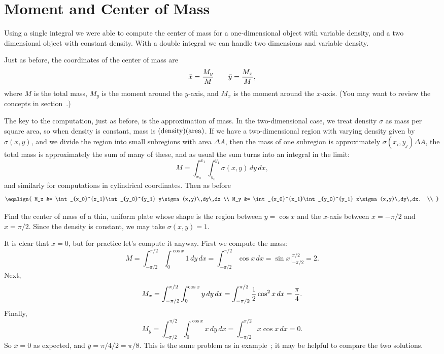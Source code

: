 \section{Moment and Center of Mass}{}{}

Using a single integral we were able to compute the center of mass for
a one-dimensional object with variable density, and a two dimensional
object with constant density. With a double integral we can handle two
dimensions and variable density.

Just as before, the coordinates of the center of mass are
$$\bar x={M_y\over M} \qquad \bar y={M_x\over M},$$
where $M$ is the total mass, $M_y$ is the moment
 around the $y$-axis,
and $M_x$ is the moment around the $x$-axis. (You may want to review
the concepts in section~.) 

The key to the computation, just as before, is the approximation of
mass. In the two-dimensional case, we treat density $\sigma$ as mass
per square area, so when density is constant, mass is 
$(\hbox{density})(\hbox{area})$. If we have a two-dimensional region
with varying density given by $\sigma(x,y)$, and we divide the region
into small subregions with area $\Delta A$, then the mass of one
subregion is approximately $\sigma(x_i,y_j)\Delta A$, the total mass
is approximately the sum of many of these, 
and as usual the sum
turns into an integral in the limit:
$$M=\int_{x_0}^{x_1}\int_{y_0}^{y_1} \sigma(x,y)\,dy\,dx,$$
and similarly for computations in cylindrical coordinates.
Then as before
$$\eqalign{
M_x &= \int_{x_0}^{x_1}\int_{y_0}^{y_1} y\sigma(x,y)\,dy\,dx \\
M_y &= \int_{x_0}^{x_1}\int_{y_0}^{y_1} x\sigma(x,y)\,dy\,dx. \\
}$$

\begin{example} Find the center of mass of a thin, uniform plate whose shape
is the region between $y=\cos x$ and the $x$-axis between $x=-\pi/2$
and $x=\pi/2$. Since the density is constant, we may take
$\sigma(x,y)=1$. 

It is clear that $\bar x=0$, but for practice let's
compute it anyway. First we compute the mass:
$$
M=\int_{-\pi/2}^{\pi/2} \int_0^{\cos x} 1\,dy\,dx
=\int_{-\pi/2}^{\pi/2} \cos x\,dx
=\left.\sin x\right|_{-\pi/2}^{\pi/2}=2.
$$
Next,
$$
M_x=\int_{-\pi/2}^{\pi/2} \int_0^{\cos x} y\,dy\,dx
=\int_{-\pi/2}^{\pi/2} {1\over2}\cos^2 x\,dx={\pi\over4}.
$$
Finally,
$$
M_y=\int_{-\pi/2}^{\pi/2} \int_0^{\cos x} x\,dy\,dx
=\int_{-\pi/2}^{\pi/2} x\cos x\,dx=0.
$$
So $\bar x=0$ as expected, and $\bar y=\pi/4/2=\pi/8$. 
This is the same problem as in example~; it may be helpful to compare the two solutions.
\end{example}

